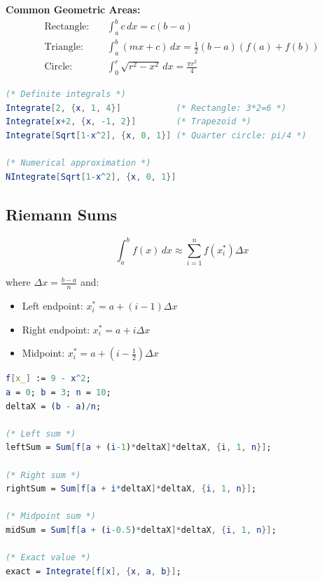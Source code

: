 \documentclass[12pt,a4paper]{article}
\begin{document}
\begin{formulabox}
    \textbf{Common Geometric Areas:}
    \begin{align*}
    \text{Rectangle:} &\quad \int_a^b c\,dx = c(b-a) \\
    \text{Triangle:} &\quad \int_a^b (mx + c)\,dx = \frac{1}{2}(b-a)(f(a)+f(b)) \\
    \text{Circle:} &\quad \int_0^r \sqrt{r^2 - x^2}\,dx = \frac{\pi r^2}{4}
    \end{align*}
\end{formulabox}

\begin{mathematicabox}
    \begin{lstlisting}[language=Mathematica, basicstyle=\ttfamily\small]
(* Definite integrals *)
Integrate[2, {x, 1, 4}]           (* Rectangle: 3*2=6 *)
Integrate[x+2, {x, -1, 2}]        (* Trapezoid *)
Integrate[Sqrt[1-x^2], {x, 0, 1}] (* Quarter circle: pi/4 *)

(* Numerical approximation *)
NIntegrate[Sqrt[1-x^2], {x, 0, 1}]
    \end{lstlisting}
\end{mathematicabox}

\subsection{Riemann Sums}

\begin{definitionbox}
    \[ \int_a^b f(x)\,dx \approx \sum_{i=1}^n f(x_i^*) \Delta x \]
    
    where \(\Delta x = \frac{b-a}{n}\) and:
    \begin{itemize}
        \item Left endpoint: \(x_i^* = a + (i-1)\Delta x\)
        \item Right endpoint: \(x_i^* = a + i\Delta x\)
        \item Midpoint: \(x_i^* = a + (i-\frac{1}{2})\Delta x\)
    \end{itemize}
\end{definitionbox}

\begin{mathematicabox}
    \begin{lstlisting}[language=Mathematica, basicstyle=\ttfamily\small]
f[x_] := 9 - x^2;
a = 0; b = 3; n = 10;
deltaX = (b - a)/n;

(* Left sum *)
leftSum = Sum[f[a + (i-1)*deltaX]*deltaX, {i, 1, n}];

(* Right sum *)
rightSum = Sum[f[a + i*deltaX]*deltaX, {i, 1, n}];

(* Midpoint sum *)
midSum = Sum[f[a + (i-0.5)*deltaX]*deltaX, {i, 1, n}];

(* Exact value *)
exact = Integrate[f[x], {x, a, b}];
    \end{lstlisting}
\end{mathematicabox}
\end{document}
